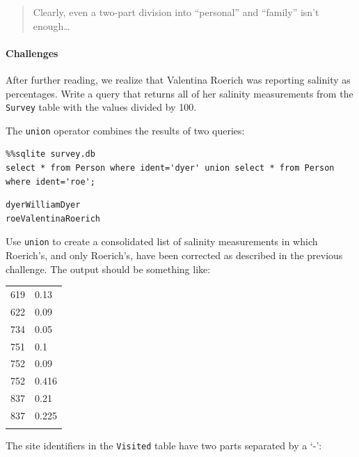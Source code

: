 \documentclass{book}
\begin{document}
\begin{quote}
Clearly, even a two-part division into ``personal'' and ``family'' isn't
enough\ldots{}
\end{quote}

\mbox{}\paragraph{Challenges}

\begin{swcenumerate}
\item
  After further reading, we realize that Valentina Roerich was reporting
  salinity as percentages. Write a query that returns all of her
  salinity measurements from the \texttt{Survey} table with the values
  divided by 100.
\item
  The \texttt{union} operator combines the results of two queries:
\end{swcenumerate}

\begin{verbatim}
%%sqlite survey.db
select * from Person where ident='dyer' union select * from Person where ident='roe';
\end{verbatim}

\begin{verbatim}
dyerWilliamDyer
roeValentinaRoerich
\end{verbatim}

Use \texttt{union} to create a consolidated list of salinity
measurements in which Roerich's, and only Roerich's, have been corrected
as described in the previous challenge. The output should be something
like:

\begin{tabular}{@{}ll@{}}
\hline\noalign{\medskip}
619 & 0.13
\\\noalign{\medskip}
622 & 0.09
\\\noalign{\medskip}
734 & 0.05
\\\noalign{\medskip}
751 & 0.1
\\\noalign{\medskip}
752 & 0.09
\\\noalign{\medskip}
752 & 0.416
\\\noalign{\medskip}
837 & 0.21
\\\noalign{\medskip}
837 & 0.225
\\\noalign{\medskip}
\hline
\end{tabular}

\begin{swcenumerate}
\setcounter{enumi}{2}
\item
  The site identifiers in the \texttt{Visited} table have two parts
  separated by a `-':
\end{swcenumerate}
\end{document}
